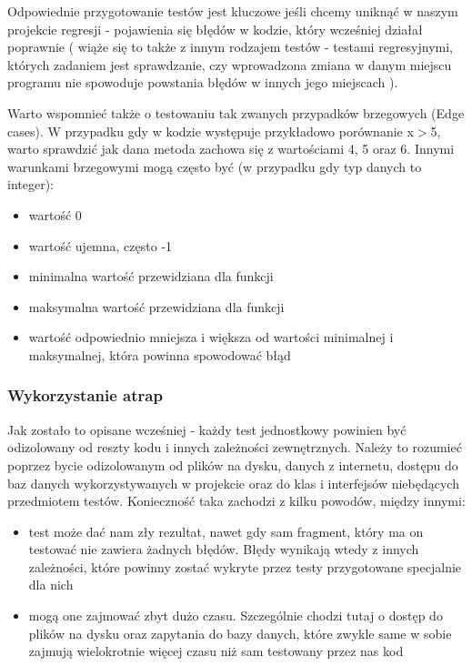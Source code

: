 Odpowiednie przygotowanie testów jest kluczowe jeśli chcemy uniknąć w naszym projekcie regresji - pojawienia się błędów w kodzie, który wcześniej działał poprawnie ( wiąże się to także z innym rodzajem testów - testami regresyjnymi, których zadaniem jest sprawdzanie, czy wprowadzona zmiana w danym miejscu programu nie spowoduje powstania błędów w innych jego miejscach \cite{RegressionTesting}). 

Warto wspomnieć także o testowaniu tak zwanych przypadków brzegowych (Edge cases). W przypadku gdy w kodzie występuje przykładowo porównanie x$>$5, warto sprawdzić jak dana metoda zachowa się z wartościami 4, 5 oraz 6. Innymi warunkami brzegowymi mogą często być (w przypadku gdy typ danych to integer): 
\begin{itemize}
    \item wartość 0
    \item wartość ujemna, często -1
    \item minimalna wartość przewidziana dla funkcji
    \item maksymalna wartość przewidziana dla funkcji
    \item wartość odpowiednio mniejsza i większa od wartości minimalnej i maksymalnej, która powinna spowodować błąd 
\end{itemize}

\subsubsection{Wykorzystanie atrap}
Jak zostało to opisane wcześniej - każdy test jednostkowy powinien być odizolowany od reszty kodu i innych zależności zewnętrznych. Należy to rozumieć poprzez bycie odizolowanym od plików na dysku, danych z internetu, dostępu do baz danych wykorzystywanych w projekcie oraz do klas i interfejsów niebędących przedmiotem testów. Konieczność taka zachodzi z kilku powodów, między innymi: 
\begin{itemize}
    \item test może dać nam zły rezultat, nawet gdy sam fragment, który ma on testować nie zawiera żadnych błędów. Błędy wynikają wtedy z innych zależności, które powinny zostać wykryte przez testy przygotowane specjalnie dla nich
    \item mogą one zajmować zbyt dużo czasu. Szczególnie chodzi tutaj o dostęp do plików na dysku oraz zapytania do bazy danych, które zwykle same w sobie zajmują wielokrotnie więcej czasu niż sam testowany przez nas kod
\end{itemize}

